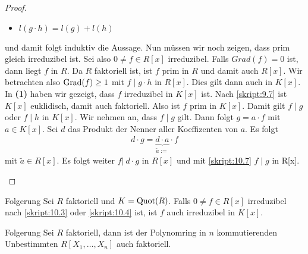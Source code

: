\begin{proof}
\begin{enumerate}
\begin{itemize}
			\item
			$l(g \cdot h) = l(g) + l(h) $
		\end{itemize}
		und damit folgt induktiv die Aussage.
		Nun müssen wir noch zeigen, dass prim gleich irreduzibel ist.
		Sei also $0 \neq f \in R[x]$ irreduzibel.
		Falls $Grad(f) = 0$ ist, dann liegt $f$ in $R$.
		Da $R$ faktoriell ist, ist $f$ prim in $R$ und damit auch $R[x]$.
		Wir betrachten also $\operatorname{Grad}(f) \geq 1 $ 
		mit $f \mid g \cdot h$ in $R[x]$.
		Dies gilt dann auch in $K[x]$.
		In \textbf{(1)} haben wir gezeigt, dass $f$ irreduzibel in $K[x]$ ist.
		Nach \ref{skript:9.7} ist $K[x]$ euklidisch, damit auch faktoriell.
		Also ist $f$ prim in $K[x]$.
		Damit gilt $f \mid g$ oder $f \mid h$ in $K[x]$.
		Wir nehmen an, dass $f \mid g$ gilt.
		Dann folgt $g = a \cdot f  $ mit $a \in K[x]$.
		Sei $d$ das Produkt der Nenner aller Koeffizenten von $a$. 
		Es folgt 
		\begin{align*}
		d \cdot g =   \underbrace{d \cdot a}_{\tilde{a}:=} \cdot f
		\end{align*}
		mit $\tilde{a} \in R[x]$.
		Es folgt weiter $f | \ d \cdot g $ in $R[x]$ und mit \ref{skript:10.7} 
		$f \mid g$ in R[x].
	\end{enumerate}		
\end{proof}

\begin{genericthm}{Folgerung}\label{skript:10.10}
	Sei $R$ faktoriell und $K = \operatorname{Quot}(R)$.
	Falls $0 \neq f \in R[x]$ irreduzibel nach \ref{skript:10.3}
	oder \ref{skript:10.4} ist, ist $f$ auch irreduzibel in $K[x]$.
\end{genericthm}

\begin{genericthm}{Folgerung}\label{skript:10.11}
	Sei $R$ faktoriell, dann ist der Polynomring
	in $n$ kommutierenden Unbestimmten
	$R[X_1,\dots,X_n]$
	auch faktoriell.
\end{genericthm}